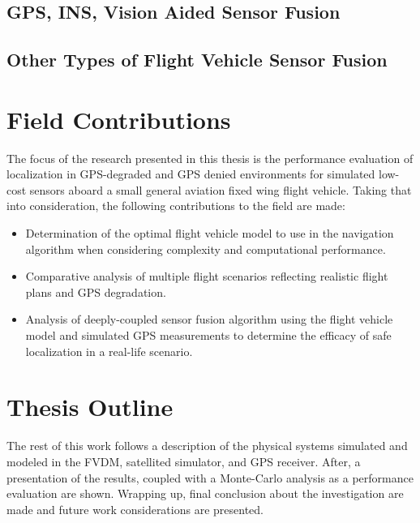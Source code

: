 \documentclass[12pt]{report}
\begin{document}
\subsection{GPS, INS, Vision Aided Sensor Fusion}

\subsection{Other Types of Flight Vehicle Sensor Fusion}

\section{Field Contributions}
The focus of the research presented in this thesis is the performance evaluation of localization in GPS-degraded and GPS denied environments for simulated low-cost sensors aboard a small general aviation fixed wing flight vehicle. Taking that into consideration, the following contributions to the field are made:
\begin{itemize}
  \item Determination of the optimal flight vehicle model to use in the navigation algorithm when considering complexity and computational performance.
  \item Comparative analysis of multiple flight scenarios reflecting realistic flight plans and GPS degradation.
  \item Analysis of deeply-coupled sensor fusion algorithm using the flight vehicle model and simulated GPS measurements to determine the efficacy of safe localization in a real-life scenario.
\end{itemize}

\section{Thesis Outline}
The rest of this work follows a description of the physical systems simulated and modeled in the FVDM, satellited simulator, and GPS receiver. After, a presentation of the results, coupled with a Monte-Carlo analysis as a performance evaluation are shown. Wrapping up, final conclusion about the investigation are made and future work considerations are presented.
\end{document}
